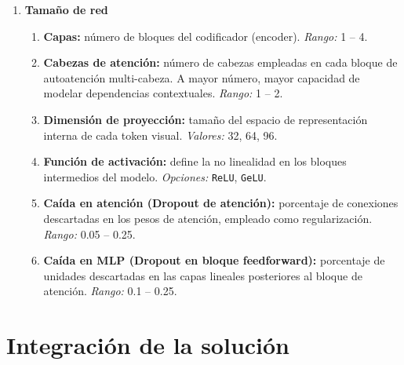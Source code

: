 \begin{enumerate}
	\item \textbf{Tamaño de red}
	\begin{enumerate}
		\item \textbf{Capas:} número de bloques del codificador (encoder).  
		\textit{Rango: } 1 -- 4.
		\item \textbf{Cabezas de atención:} número de cabezas empleadas en cada bloque de autoatención multi-cabeza.
		A mayor número, mayor capacidad de modelar dependencias contextuales.  
		\textit{Rango: } 1 -- 2.
		\item \textbf{Dimensión de proyección:} tamaño del espacio de representación interna de cada token visual.
		\textit{Valores: } 32, 64, 96.
		\item \textbf{Función de activación:} define la no linealidad en los bloques intermedios del modelo.  
		\textit{Opciones: } \texttt{ReLU}, \texttt{GeLU}.
		\item \textbf{Caída en atención (Dropout de atención):} porcentaje de conexiones descartadas
		en los pesos de atención, empleado como regularización.  
		\textit{Rango: } 0.05 -- 0.25.
		\item \textbf{Caída en MLP (Dropout en bloque feedforward):} porcentaje de unidades descartadas
		en las capas lineales posteriores al bloque de atención.  
		\textit{Rango: } 0.1 -- 0.25.
	\end{enumerate}
\end{enumerate}

\section{Integración de la solución}

% 	

